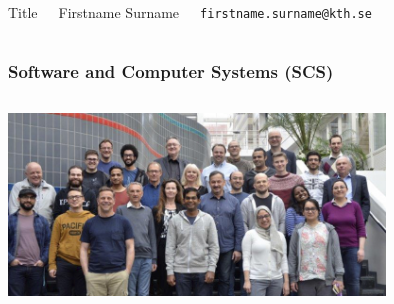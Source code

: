 \documentclass[aspectratio=1610]{beamer}
\begin{document}
\begin{frame}

  \vspace{0.02\textheight}
  
\begin{columns}[]
\column{37em}
\Large{\centerline{Title}}

\vspace{0.1\textheight}

\small{\centerline{Firstname Surname}}
\scriptsize{\centerline{\tt firstname.surname@kth.se}}
\scriptsize{\centerline{}}
\end{columns}
\end{frame}


\begin{frame}
\frametitle{Software and Computer Systems (SCS)}
\begin{columns}
\column{37em}
\hspace*{2cm}\includegraphics[width=10cm]{figs/scs.png}
\end{columns}
\end{frame}
\end{document}
